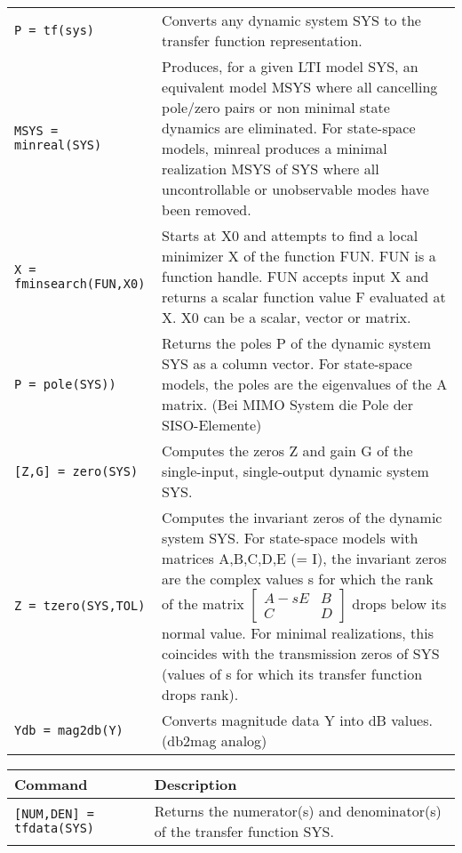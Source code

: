 \begin{center}
\begin{tabular}{p{5cm}|p{8.5cm}}
        \texttt{P = tf(sys)}  & Converts any dynamic system SYS to the transfer function representation. \\
        
        \texttt{MSYS = minreal(SYS)}  &  Produces, for a given LTI model SYS, an equivalent model MSYS where all cancelling pole/zero pairs or non minimal state dynamics are eliminated.  For state-space models, minreal produces a minimal realization MSYS of SYS where all uncontrollable or unobservable modes have been removed.\\
        
        \texttt{X = fminsearch(FUN,X0)}  &  Starts at X0 and attempts to find a local minimizer X of the function FUN.  FUN is a function handle.  FUN accepts input X and returns a scalar function value F evaluated at X. X0 can be a scalar, vector or matrix.\\
        
        \texttt{P = pole(SYS))}  & Returns the poles P of the dynamic system SYS as a column vector. For state-space models, the poles are the eigenvalues of the A matrix. (Bei MIMO System die Pole der SISO-Elemente) \\
        
        \texttt{[Z,G] = zero(SYS)} & Computes the zeros Z and gain G of the single-input, single-output dynamic system SYS.\\
        
        \texttt{Z = tzero(SYS,TOL)}  &  Computes the invariant zeros of the dynamic system SYS. For state-space models with matrices A,B,C,D,E (= I), the invariant zeros are the complex values s for which the rank of the matrix $\begin{bmatrix} A -sE & B\\ C & D\end{bmatrix}$ drops below its normal value. For minimal realizations, this coincides with the transmission zeros of SYS (values of s for which its transfer function drops rank).\\ 
        
        \texttt{Ydb = mag2db(Y)} & Converts magnitude data Y into dB values. (db2mag analog)
 
        
    \end{tabular}
    \begin{tabular}{p{5cm}|p{8.5cm}}
        \textbf{Command}    &   \textbf{Description}\\
        \hline
        \texttt{[NUM,DEN] = tfdata(SYS)} & Returns the numerator(s) and denominator(s) of the transfer function SYS. \\
        

\end{tabular}
\end{center}
